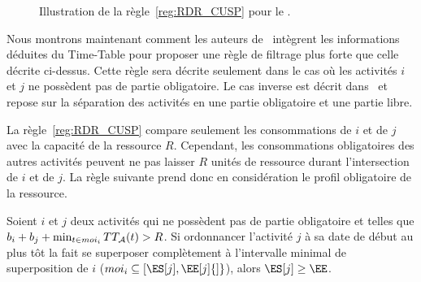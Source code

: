 \begin{ex}
\begin{figure}[!htb]
    \caption{Illustration de la règle~\ref{reg:RDR_CUSP} pour le \CUSP.}
    \label{fig:RDR_CUSP}
  \end{figure}
\end{ex}

Nous montrons maintenant comment les auteurs de~\cite{Gay2015}
intègrent les informations déduites du Time-Table pour proposer une
règle de filtrage plus forte que celle décrite ci-dessus. Cette règle
sera décrite seulement dans le cas où les activités $i$ et $j$ ne
possèdent pas de partie obligatoire. Le cas inverse est décrit
dans~\cite{Gay2015} et repose sur la séparation des activités en une
partie obligatoire et une partie libre.


La règle~\ref{reg:RDR_CUSP} compare seulement les consommations de $i$
et de $j$ avec la capacité de la ressource $R$. Cependant, les
consommations obligatoires des autres activités peuvent ne pas laisser
$R$ unités de ressource durant l'intersection de $i$ et de $j$. La
règle suivante prend donc en considération le profil obligatoire de la
ressource.

\begin{reg}
\label{reg:TTDR_CUSP}
Soient $i$ et $j$ deux activités qui ne possèdent pas de partie
obligatoire et telles que $ b_i +b_j + \min_{t \in moi_i} TT_{{\cal A}}(t) >
R$.   Si ordonnancer l'activité
 $j$ à sa date de début au plus tôt la fait se superposer complètement
 à l’intervalle minimal de superposition de $i$ ($moi_i \subseteq
 [\ES[j],\EE[j]{]}$), alors $\ES[j] \ge \EE$.
\end{reg}

